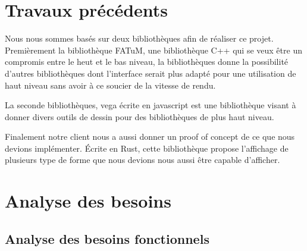 \documentclass[12pt]{article}
\begin{document}
\section{Travaux précédents}

Nous nous sommes basés sur deux bibliothèques afin de réaliser ce projet.
Premièrement la bibliothèque FATuM, une bibliothèque C++ qui se veux être un compromis entre le heut et le bas niveau, la bibliothèques donne la possibilité d'autres bibliothèques dont l'interface serait plus adapté pour une utilisation de haut niveau sans avoir à ce soucier de la vitesse de rendu.

La seconde bibliothèques, vega écrite en javascript est une bibliothèque visant à donner divers outils de dessin pour des bibliothèques de plus haut niveau.

Finalement notre client nous a aussi donner un proof of concept de ce que nous devions implémenter. Écrite en Rust, cette bibliothèque propose l'affichage de plusieurs type de forme que nous devions nous aussi être capable d'afficher.

\section{Analyse des besoins}
\subsection{Analyse des besoins fonctionnels}
\end{document}
